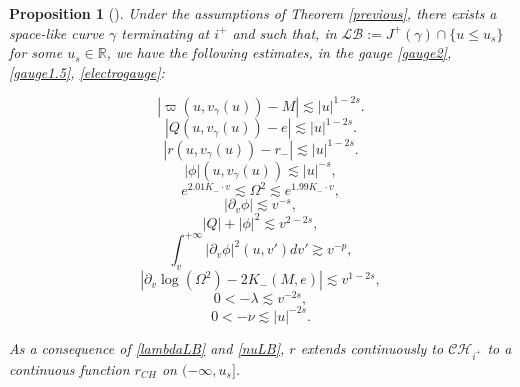 \documentclass[10pt,a4paper]{article}
\theoremstyle{plain}
\newtheorem{prop}[thm]{Proposition}
\theoremstyle{remark}
\theoremstyle{definition}
\newcommand{\RR}{\mathbb{R}}
\theoremstyle{plain}
\theoremstyle{remark}
\theoremstyle{definition}
\newcommand{\CH}{\mathcal{CH}_{i^+}}
\numberwithin{equation}{section}
\begin{document}
\begin{prop}[\cite{Moi}]\label{LBprop}
	Under the assumptions of Theorem \ref{previous}, there exists a space-like curve $\gamma$ terminating at $i^+$ and such that, in $\mathcal{LB}:=J^+(\gamma) \cap \{ u \leq u_s \}$ for some $u_s \in \RR$, we have the following estimates, in the gauge \eqref{gauge2}, \eqref{gauge1.5}, \eqref{electrogauge}:
	
	\begin{equation} \label{varpigamma}
	|\varpi(u,v_{\gamma}(u))-M| \lesssim |u|^{1-2s}.
	\end{equation}	
	\begin{equation} \label{Qgamma}
	|Q(u,v_{\gamma}(u))-e| \lesssim |u|^{1-2s}.
	\end{equation}	
	\begin{equation} \label{rgamma}
	|r(u,v_{\gamma}(u))-r_- | \lesssim |u|^{1-2s}.
	\end{equation} \begin{equation} \label{phigamma}
	|\phi|(u,v_{\gamma}(u)) \lesssim |u|^{-s},
	\end{equation}	\begin{equation} \label{Omegaexp}
	e^{2.01 K_- \cdot v}	  \lesssim 		\Omega^2 \lesssim e^{1.99 K_- \cdot v},
	\end{equation}	\begin{equation} \label{phiVLB}
	| \partial_v \phi| \lesssim v^{-s},
	\end{equation}\begin{equation} \label{QphiLB}
	|Q|+ |\phi|^2 \lesssim v^{2-2s},
	\end{equation}		
	\begin{equation} \label{phiVLBlowerbound}
	\int_{v}^{+\infty}	|\partial_v \phi|^2(u,v') dv' \gtrsim v^{-p},
	\end{equation}	\begin{equation} \label{partialvOmegaLB}
	|\partial_v \log(\Omega^2)-2K_-(M,e) |  \lesssim    v^{1-2s},
	\end{equation}					
	\begin{equation} \label{lambdaLB}
	0<	 -\lambda \lesssim  v^{-2s},
	\end{equation}
	\begin{equation} \label{nuLB}
	0< -\nu \lesssim |u|^{-2s}.
	\end{equation}
	
	As a consequence of \eqref{lambdaLB} and \eqref{nuLB}, $r$ extends continuously to $\CH$ to a continuous function $r_{CH}$ on $(-\infty,u_s]$.
	
	
	
	
	
	
\end{prop}
\end{document}
